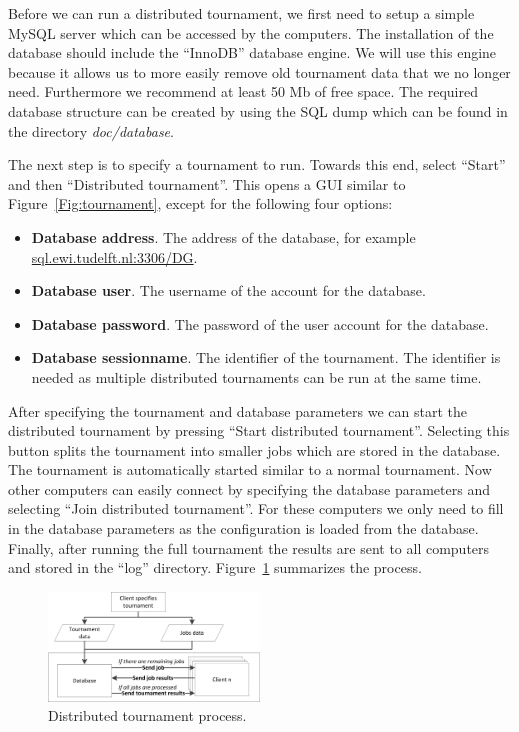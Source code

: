 \documentclass[]{article}
\begin{document}
Before we can run a distributed tournament, we first need to setup a simple MySQL server which can be accessed by the computers. The installation of the database should include the ``InnoDB'' database engine. We will use this engine because it allows us to more easily remove old tournament data that we no longer need. Furthermore we recommend at least 50 Mb of free space. The required database structure can be created by using the SQL dump which can be found in the directory \textit{doc/database}.

The next step is to specify a tournament to run. Towards this end, select ``Start'' and then ``Distributed tournament''. This opens a GUI similar to Figure~\ref{Fig:tournament}, except for the following four options:

\begin{itemize}
	\item \textbf{Database address}. The address of the database, for example \url{sql.ewi.tudelft.nl:3306/DG}.
	\item \textbf{Database user}. The username of the account for the database.
	\item \textbf{Database password}. The password of the user account for the database.
	\item \textbf{Database sessionname}. The identifier of the tournament. The identifier is needed as multiple distributed tournaments can be run at the same time.
\end{itemize}

After specifying the tournament and database parameters we can start the distributed tournament by pressing ``Start distributed tournament''. Selecting this button splits the tournament into smaller jobs which are stored in the database. The tournament is automatically started similar to a normal tournament. Now other computers can easily connect by specifying the database parameters and selecting ``Join distributed tournament''. For these computers we only need to fill in the database parameters as the configuration is loaded from the database. Finally, after running the full tournament the results are sent to all computers and stored in the ``log'' directory. Figure~\ref{fig:dtournament} summarizes the process.

\begin{figure}[htb]
	\centering
	\includegraphics[width=0.50\textwidth]{media/DistributedGenius.png}
\caption{Distributed tournament process.}\label{fig:dtournament}
\end{figure}
\end{document}
